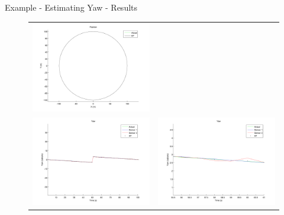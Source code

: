 \documentclass[hyperref={pdfpagelabels=false}]{beamer}
\begin{document}
\begin{frame}{Example - Estimating Yaw - Results}
\begin{figure}[ht!]
    \centering
    \begin{tabular}{c c}
    \includegraphics[width=.45\textwidth]{images/kfSimPosition} \\
    \includegraphics[width=.45\textwidth]{images/kfSimYaw} &
    \includegraphics[width=.45\textwidth]{images/kfSimYawZoom}
    \end{tabular}
\end{figure}
\end{frame}
\end{document}
